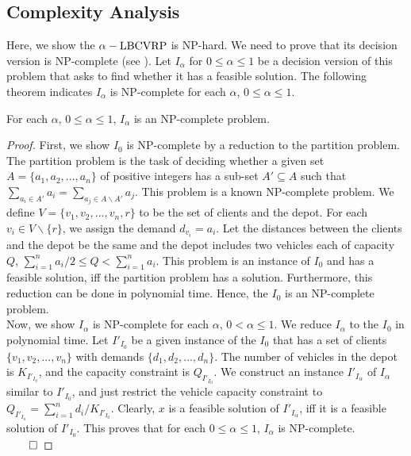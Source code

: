 \subsection{Complexity Analysis}
\noindent Here, we show the ${\rm{\alpha-LBCVRP}}$ is NP-hard. We need to prove that its decision version is NP-complete (see \cite{Garey}). Let ${I_\alpha }$  for $0 \le \alpha \le 1$ be a decision version of this problem that asks to find whether it has a feasible solution. The following theorem indicates ${I_\alpha }$  is NP-complete for each $\alpha$, $0 \le \alpha \le 1$. 
\begin{theorem}
For each $\alpha$, $0 \le \alpha \le 1$, ${I_\alpha }$  is an NP-complete problem.
\end{theorem}
\begin{proof}
\noindent  First, we show ${I_0 }$ is NP-complete by a reduction to the partition problem. The partition problem is the task of deciding whether a given set $A = \{ {a_1},{a_2},...,{a_n}\}$ of positive integers has a sub-set $A' \subseteq A$  such that $\sum\nolimits_{{a_i} \in A'} {{a_i}}  = \sum\nolimits_{{a_j} \in A\backslash A'} {{a_j}} $. This problem is a known NP-complete problem. We define $V = \{ {v_1},{v_2},...,{v_n},r\} $ to be the set of clients and the depot. For each ${v_i} \in V\backslash \{ r\} $, we assign the demand ${d_{{v_i}}} = {a_i}$. Let the distances between the clients and the depot be the same and the depot includes two vehicles each of capacity $Q$, $\sum\nolimits_{i = 1}^n {{a_i}} /2 \le Q < \sum\nolimits_{i = 1}^n {{a_i}} $. This problem is an instance of ${I_0 }$ and has a feasible solution, iff the partition problem has a solution. Furthermore, this reduction can be done in polynomial time. Hence, the ${I_0 }$ is an NP-complete problem. \\
\indent Now, we show $I_\alpha$ is NP-complete for each $\alpha$, $0 < \alpha  \le 1$. We reduce $I_{\alpha}$ to the $I_0$ in polynomial time. Let $I'_{I_0}$ be a given instance of the $I_{0}$ that has a set of clients $ \{v_1,v_2,...,v_n\}$ with demands $\{d_1,d_2,...,d_n\}$. The number of vehicles in the depot is $K_{I'_{I_0}}$, and the capacity constraint is $Q_{I'_{I_0}}$. We construct an instance $I'_{I_\alpha }$ of $I_\alpha$ similar to $I'_{I_0}$, and just restrict the vehicle capacity constraint to $Q_{I'_{I_\alpha}}=\sum\nolimits_{i = 1}^n {d_i} /K_{I'_{I_0}}$. Clearly, $x$ is a feasible solution of $I'_{I_\alpha}$, iff it is a feasible solution of $I'_{I_0}$. This proves that for each $0 \le \alpha \le 1$, ${I_\alpha }$ is NP-complete.\\
 $\qed$
\end{proof}

